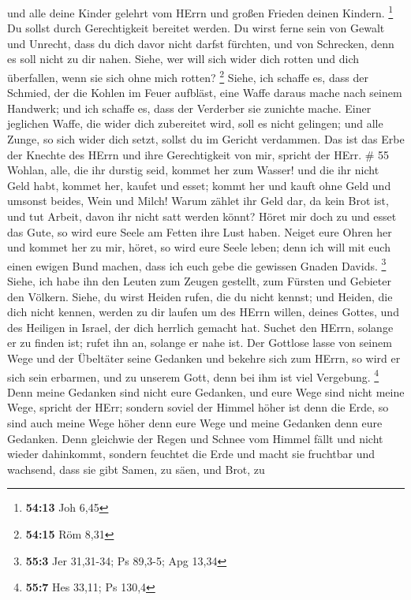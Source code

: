 und alle deine Kinder gelehrt vom HErrn und großen Frieden deinen
Kindern. \footnote{\textbf{54:13} Joh 6,45}  Du sollst
durch Gerechtigkeit bereitet werden. Du wirst ferne sein von Gewalt und
Unrecht, dass du dich davor nicht darfst fürchten, und von Schrecken,
denn es soll nicht zu dir nahen.  Siehe, wer will sich
wider dich rotten und dich überfallen, wenn sie sich ohne mich rotten?
\footnote{\textbf{54:15} Röm 8,31}  Siehe, ich schaffe es,
dass der Schmied, der die Kohlen im Feuer aufbläst, eine Waffe daraus
mache nach seinem Handwerk; und ich schaffe es, dass der Verderber sie
zunichte mache.  Einer jeglichen Waffe, die wider dich
zubereitet wird, soll es nicht gelingen; und alle Zunge, so sich wider
dich setzt, sollst du im Gericht verdammen. Das ist das Erbe der Knechte
des HErrn und ihre Gerechtigkeit von mir, spricht der HErr. \# 55
 Wohlan, alle, die ihr durstig seid, kommet her zum Wasser!
und die ihr nicht Geld habt, kommet her, kaufet und esset; kommt her und
kauft ohne Geld und umsonst beides, Wein und Milch!  Warum
zählet ihr Geld dar, da kein Brot ist, und tut Arbeit, davon ihr nicht
satt werden könnt? Höret mir doch zu und esset das Gute, so wird eure
Seele am Fetten ihre Lust haben.  Neiget eure Ohren her und
kommet her zu mir, höret, so wird eure Seele leben; denn ich will mit
euch einen ewigen Bund machen, dass ich euch gebe die gewissen Gnaden
Davids. \footnote{\textbf{55:3} Jer 31,31-34; Ps 89,3-5; Apg 13,34}
 Siehe, ich habe ihn den Leuten zum Zeugen gestellt, zum
Fürsten und Gebieter den Völkern.  Siehe, du wirst Heiden
rufen, die du nicht kennst; und Heiden, die dich nicht kennen, werden zu
dir laufen um des HErrn willen, deines Gottes, und des Heiligen in
Israel, der dich herrlich gemacht hat.  Suchet den HErrn,
solange er zu finden ist; rufet ihn an, solange er nahe ist.
 Der Gottlose lasse von seinem Wege und der Übeltäter seine
Gedanken und bekehre sich zum HErrn, so wird er sich sein erbarmen, und
zu unserem Gott, denn bei ihm ist viel Vergebung. \footnote{\textbf{55:7}
  Hes 33,11; Ps 130,4}  Denn meine Gedanken sind nicht eure
Gedanken, und eure Wege sind nicht meine Wege, spricht der HErr;
 sondern soviel der Himmel höher ist denn die Erde, so sind
auch meine Wege höher denn eure Wege und meine Gedanken denn eure
Gedanken.  Denn gleichwie der Regen und Schnee vom Himmel
fällt und nicht wieder dahinkommt, sondern feuchtet die Erde und macht
sie fruchtbar und wachsend, dass sie gibt Samen, zu säen, und Brot, zu
